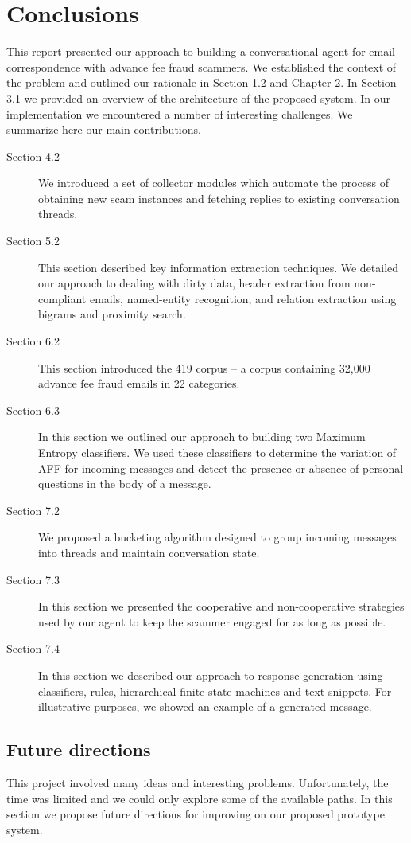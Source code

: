 \chapter{Conclusions}
This report presented our approach to building a conversational agent for email correspondence with advance fee fraud scammers.
We established the context of the problem and outlined our rationale in Section 1.2 and Chapter 2. In Section 3.1 we provided an
overview of the architecture of the proposed system. In our implementation we encountered a number of interesting challenges.
We summarize here our main contributions.
\begin{description}
\item[Section 4.2] We introduced a set of collector modules which automate the process of obtaining new scam instances and fetching replies to existing conversation threads.
\item[Section 5.2] This section described key information extraction techniques. We detailed our approach to dealing with dirty data, header extraction from non-compliant emails, named-entity recognition, and relation extraction using bigrams and proximity search.
\item[Section 6.2] This section introduced the 419 corpus -- a corpus containing 32,000 advance fee fraud emails in 22 categories.
\item[Section 6.3] In this section we outlined our approach to building two Maximum Entropy classifiers. We used these classifiers to determine the variation of AFF for incoming messages and detect the presence or absence of personal questions in the body of a message.
\item[Section 7.2] We proposed a bucketing algorithm designed to group incoming messages into threads and maintain conversation state.
\item[Section 7.3] In this section we presented the cooperative and non-cooperative strategies used by our agent to keep the scammer engaged for as long as possible.
\item[Section 7.4] In this section we described our approach to response generation using classifiers, rules, hierarchical finite state machines and text snippets. For illustrative purposes, we showed an example of a generated message.
\end{description}	

\section{Future directions}
This project involved many ideas and interesting problems. Unfortunately, the time was limited and we could only explore some of the available paths. In this section we propose future directions for improving on our proposed prototype system.

